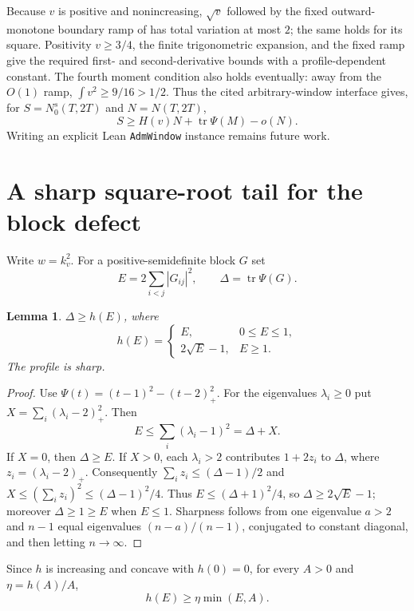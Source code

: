 \documentclass[11pt]{article}
\newtheorem{lemma}[theorem]{Lemma}
\theoremstyle{remark}
\newcommand{\tr}{\operatorname{tr}}
\begin{document}
Because $v$ is positive and nonincreasing, $\sqrt v$ followed by the fixed
outward-monotone boundary ramp of \cite[\S2.2]{Claude2026} has total variation
at most $2$; the same holds for its square.  Positivity $v\ge3/4$, the finite
trigonometric expansion, and the fixed ramp give the required first- and
second-derivative bounds with a profile-dependent constant.  The fourth
moment condition also holds eventually: away from the $O(1)$ ramp,
$\int v^2\ge9/16>1/2$.  Thus the cited arbitrary-window interface gives, for
$S=N_0^s(T,2T)$ and $N=N(T,2T)$,
\begin{equation}\label{eq:interface}
S\ge H(v)N+\tr\Psi(M)-o(N).
\end{equation}
Writing an explicit Lean \texttt{AdmWindow} instance remains future work.

\section{A sharp square-root tail for the block defect}

Write $w=k_v^2$.  For a positive-semidefinite block $G$ set
\[
E=2\sum_{i<j}|G_{ij}|^2,
\qquad \Delta=\tr\Psi(G).
\]

\begin{lemma}\label{lem:sqrt}
$\Delta\ge h(E)$, where
\[
h(E)=
\begin{cases}
E,&0\le E\le1,\\
2\sqrt E-1,&E\ge1.
\end{cases}
\]
The profile is sharp.
\end{lemma}

\begin{proof}
Use $\Psi(t)=(t-1)^2-(t-2)_+^2$.  For the eigenvalues $\lambda_i\ge0$ put
$X=\sum_i(\lambda_i-2)_+^2$.  Then
\[
E\le\sum_i(\lambda_i-1)^2=\Delta+X.
\]
If $X=0$, then $\Delta\ge E$.  If $X>0$, each $\lambda_i>2$ contributes
$1+2z_i$ to $\Delta$, where $z_i=(\lambda_i-2)_+$.  Consequently
$\sum_i z_i\le(\Delta-1)/2$ and
$X\le(\sum_i z_i)^2\le(\Delta-1)^2/4$.  Thus
$E\le(\Delta+1)^2/4$, so $\Delta\ge2\sqrt E-1$; moreover
$\Delta\ge1\ge E$ when $E\le1$.  Sharpness follows from one eigenvalue
$a>2$ and $n-1$ equal eigenvalues $(n-a)/(n-1)$, conjugated to constant
diagonal, and then letting $n\to\infty$.
\end{proof}

Since $h$ is increasing and concave with $h(0)=0$, for every $A>0$ and
$\eta=h(A)/A$,
\begin{equation}\label{eq:chord}
h(E)\ge\eta\min(E,A).
\end{equation}
\end{document}
